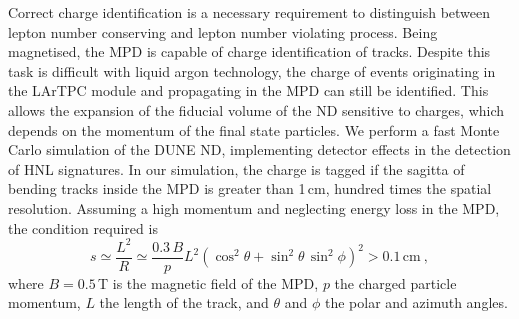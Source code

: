 Correct charge identification is a necessary requirement to distinguish between %
lepton number conserving and lepton number violating process.
Being magnetised, the MPD is capable of charge identification of tracks.
Despite this task is difficult with liquid argon technology, %
the charge of events originating in the LArTPC module and propagating in the MPD can still be identified.
This allows the expansion of the fiducial volume of the ND sensitive to charges, which depends on the momentum of the final state particles.
We perform a fast Monte Carlo simulation of the DUNE ND, %
implementing detector effects in the detection of HNL signatures.
In our simulation, the charge is tagged if the sagitta of bending tracks inside the MPD is greater than 1\,cm, %
hundred times the spatial resolution.
Assuming a high momentum and neglecting energy loss in the MPD, the condition required is 
\begin{equation*}
	s \simeq \frac{L^2}{R} \simeq \frac{0.3\,B}{p} L^2 %
	(\cos^2\theta + \sin^2\theta\, \sin^2\phi)^2 > 0.1\,\text{cm}\ ,
\end{equation*}
where $B = 0.5$\,T is the magnetic field of the MPD, $p$ the charged particle momentum, %
$L$ the length of the track, and $\theta$ and $\phi$ the polar and azimuth angles.

